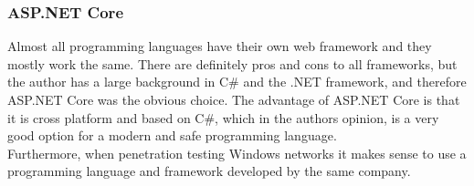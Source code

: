 \documentclass{article}
\begin{document}
\subsubsection{ASP.NET Core}
Almost all programming languages have their own web framework and they mostly work the same. There are definitely pros and cons to all frameworks, but the author has a large background in C\# and the .NET framework, and therefore ASP.NET Core was the obvious choice. The advantage of ASP.NET Core is that it is cross platform\cite{url:implementation:aspnet-core} and based on C\#, which in the authors opinion, is a very good option for a modern and safe programming language.\\
Furthermore, when penetration testing Windows networks it makes sense to use a programming language and framework developed by the same company.
\end{document}

